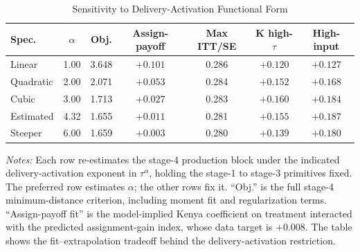 \begin{table}[H]
\centering
\caption{Sensitivity to Delivery-Activation Functional Form}
\label{tab:struct_delivery_activation}
\begin{threeparttable}
\scriptsize
\begin{tabular}[t]{@{}lcccccc@{}}
\toprule
Spec. & $\alpha$ & Obj. & Assign-payoff & Max ITT/SE & K high-$\tau$ & High-input \\
\midrule
Linear & 1.00 & 3.648 & $+0.101$ & 0.286 & $+0.120$ & $+0.127$ \\
Quadratic & 2.00 & 2.071 & $+0.053$ & 0.284 & $+0.152$ & $+0.168$ \\
Cubic & 3.00 & 1.713 & $+0.027$ & 0.283 & $+0.160$ & $+0.184$ \\
Estimated & 4.32 & 1.655 & $+0.011$ & 0.281 & $+0.155$ & $+0.187$ \\
Steeper & 6.00 & 1.659 & $+0.003$ & 0.280 & $+0.139$ & $+0.180$ \\
\bottomrule
\end{tabular}
\begin{tablenotes}
\footnotesize
\item \textit{Notes:} Each row re-estimates the stage-4 production block under the indicated delivery-activation exponent in $\tau^{\alpha}$, holding the stage-1 to stage-3 primitives fixed. The preferred row estimates $\alpha$; the other rows fix it. ``Obj.'' is the full stage-4 minimum-distance criterion, including moment fit and regularization terms. ``Assign-payoff fit'' is the model-implied Kenya coefficient on treatment interacted with the predicted assignment-gain index, whose data target is $+0.008$. The table shows the fit--extrapolation tradeoff behind the delivery-activation restriction.
\end{tablenotes}
\end{threeparttable}
\end{table}

